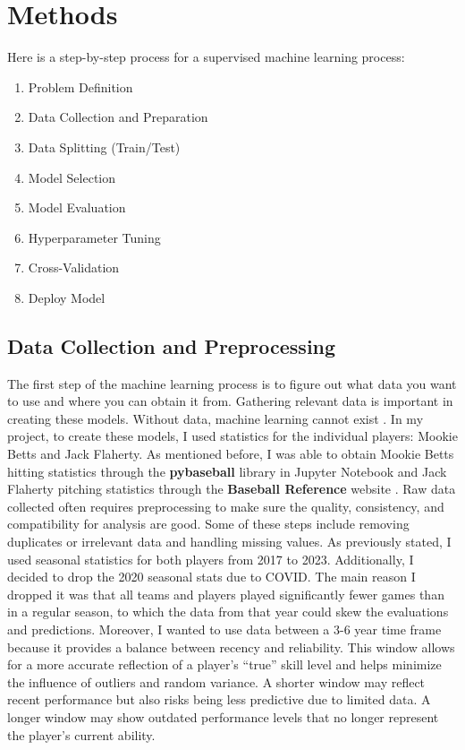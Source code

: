 \documentclass[10pt,twocolumn]{article}
\begin{document}
\section{Methods}
Here is a step-by-step process for a supervised machine learning process:
\begin{enumerate}
    \item Problem Definition 
    \item Data Collection and Preparation 
    \item Data Splitting (Train/Test)
    \item Model Selection
    \item Model Evaluation
    \item Hyperparameter Tuning
    \item Cross-Validation
    \item Deploy Model 
\end{enumerate}

\subsection{Data Collection and Preprocessing}

The first step of the machine learning process is to figure out what data you want to use and where you can obtain it from. Gathering relevant data is important in creating these models. Without data, machine learning cannot exist \cite{12}. In my project, to create these models, I used statistics for the individual players: Mookie Betts and Jack Flaherty. As mentioned before, I was able to obtain Mookie Betts hitting statistics through the \textbf{pybaseball} \cite{13}library in Jupyter Notebook and Jack Flaherty pitching statistics through the \textbf{Baseball Reference} website \cite{14}. Raw data collected often requires preprocessing to make sure the quality, consistency, and compatibility for analysis are good. Some of these steps include removing duplicates or irrelevant data and handling missing values. As previously stated, I used seasonal statistics for both players from 2017 to 2023. Additionally, I decided to drop the 2020 seasonal stats due to COVID. The main reason I dropped it was that all teams and players played significantly fewer games than in a regular season, to which the data from that year could skew the evaluations and predictions. Moreover, I wanted to use data between a 3-6 year time frame because it provides a balance between recency and reliability. This window allows for a more accurate reflection of a player’s “true” skill level and helps minimize the influence of outliers and random variance. A shorter window may reflect recent performance but also risks being less predictive due to limited data. A longer window may show outdated performance levels that no longer represent the player’s current ability. 
 
\end{document}
